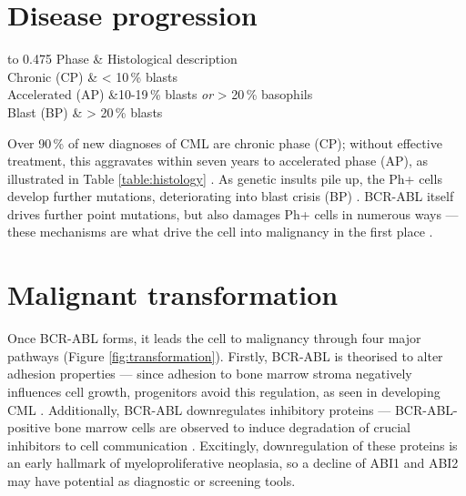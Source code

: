 \section{Disease progression}

\begin{table}
\centering
\caption{Table defining histological descriptions of the blood and bone marrow at different CML stages \citep{RefWorks:doc:583af437e4b027b9d4155dc5}.}
\begin{tabu} to 0.475\textwidth {XX[2]}
   \toprule
Phase &  Histological description\\
		\midrule
		Chronic (CP)  & < 10\,\% blasts\\
		Accelerated (AP)  &10-19\,\% blasts \textit{or} > 20\,\% basophils\\
		Blast (BP)  & > 20\,\% blasts\\
		\bottomrule
\label{table:histology}
\end{tabu}
\end{table}

Over 90\,\% of new diagnoses of CML are chronic phase (CP); without effective treatment, this aggravates within seven years to accelerated phase (AP), as illustrated in Table \ref{table:histology} \citep{RefWorks:doc:583af437e4b027b9d4155dc5}. As genetic insults pile up, the Ph+ cells develop further mutations, deteriorating into blast crisis (BP) \citep{RefWorks:doc:58309829e4b05b192d72d445}. BCR-ABL itself drives further point mutations, but also damages Ph+ cells in numerous ways --- these mechanisms are what drive the cell into malignancy in the first place \citep{RefWorks:doc:58309926e4b05b192d72d473}. 

\section{Malignant transformation}

Once BCR-ABL forms, it leads the cell to malignancy through four major pathways (Figure \ref{fig:transformation}). Firstly, BCR-ABL is theorised to alter adhesion properties --- since adhesion to bone marrow stroma negatively influences cell growth, progenitors avoid this regulation, as seen in developing CML \citep{RefWorks:doc:5838765ce4b09a21e9385e58,RefWorks:doc:5838763de4b09a21e9385e54}. Additionally, BCR-ABL downregulates inhibitory proteins --- BCR-ABL-positive bone marrow cells are observed to induce degradation of crucial inhibitors to cell communication \citep{spatchcock}. Excitingly, downregulation of these proteins is an early hallmark of myeloproliferative neoplasia, so a decline of ABI1 and ABI2 may have potential as diagnostic or screening tools.

